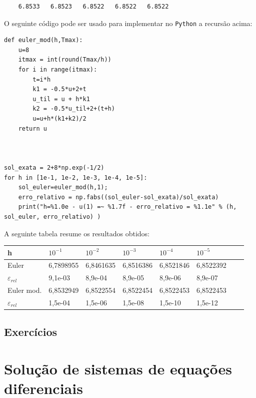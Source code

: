 \begin{resol}
\begin{verbatim}
    6.8533   6.8523   6.8522   6.8522   6.8522
\end{verbatim}
\fi
\ifispython
O seguinte código pode ser usado para implementar no \verb+Python+ a recursão acima:

\begin{verbatim}
def euler_mod(h,Tmax):
	u=8
  	itmax = int(round(Tmax/h))
	for i in range(itmax):
		t=i*h
		k1 = -0.5*u+2+t
		u_til = u + h*k1
		k2 = -0.5*u_til+2+(t+h)
		u=u+h*(k1+k2)/2
	return u



sol_exata = 2+8*np.exp(-1/2)
for h in [1e-1, 1e-2, 1e-3, 1e-4, 1e-5]:
	sol_euler=euler_mod(h,1);
	erro_relativo = np.fabs((sol_euler-sol_exata)/sol_exata)
	print("h=%1.0e - u(1) =~ %1.7f - erro_relativo = %1.1e" % (h, sol_euler, erro_relativo) )

\end{verbatim}
\fi
A seguinte tabela resume os resultados obtidos:
\begin{center}
 \begin{tabular}{|l|l|l|l|l|l|l|l|}%
\hline
   h&$10^{-1}$&$10^{-2}$&$10^{-3}$&$10^{-4}$&$10^{-5}$\\
   \hline
   Euler & 6,7898955 &  6,8461635  &  6,8516386  &  6,8521846  &  6,8522392  \\
   \hline
   $\varepsilon_{rel}$ &9,1e-03 &  8,9e-04  & 8,9e-05&   8,9e-06 &  8,9e-07\\
   \hline
  Euler mod. & 6,8532949 &  6,8522554  &  6,8522454  &  6,8522453  &  6,8522453 \\
   \hline
   $\varepsilon_{rel}$ &1,5e-04 &  1,5e-06  & 1,5e-08&   1,5e-10 &  1,5e-12\\
   \hline

   \end{tabular}
\end{center}
\end{resol}

\subsection*{Exercícios}

\construirExer

\section{Solução de sistemas de equações diferenciais}\label{sec:solsistema}

